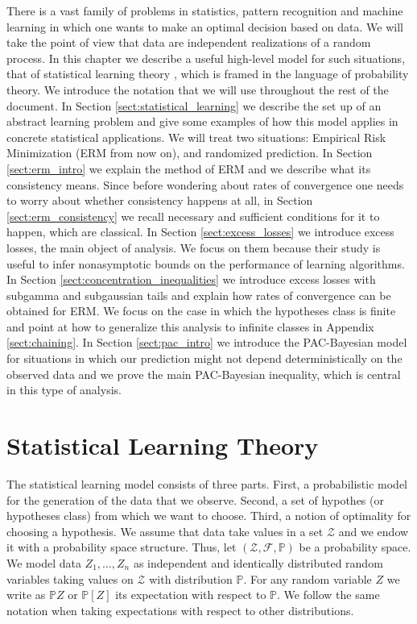 \documentclass{uvamath}
\newcommand*{\calF}{\mathcal{F}}
\newcommand*{\calZ}{\mathcal{Z}}
\newcommand*{\bbP}{\mathbb{P}}
\theoremstyle{remark}
\theoremstyle{definition}
\theoremstyle{definition}
\theoremstyle{definition}
\theoremstyle{definition}
\theoremstyle{definition}
\begin{document}
There is a vast family of problems in statistics, pattern recognition
and machine learning in which one wants to make an optimal decision
based on data. We will take the point of view that data are
independent realizations of a random process. In this chapter we
describe a useful high-level model for such situations, that of
statistical learning theory \citep{vapnik_statistical_1998}, which is
framed in the language of probability theory. We introduce the
notation that we will use throughout the rest of the document. In
Section \ref{sect:statistical_learning} we describe the set up of an
abstract learning problem and give some examples of how this model
applies in concrete statistical applications. We will treat two
situations: Empirical Risk Minimization (ERM from now on), and
randomized prediction. In Section \ref{sect:erm_intro} we explain the
method of ERM and we describe what its consistency means. Since before
wondering about rates of convergence one needs to worry about whether
consistency happens at all, in Section \ref{sect:erm_consistency} we
recall necessary and sufficient conditions for it to happen, which are
classical. In Section \ref{sect:excess_losses} we introduce excess
losses, the main object of analysis. We focus on them because their
study is useful to infer nonasymptotic bounds on the performance of
learning algorithms. In Section \ref{sect:concentration_inequalities}
we introduce excess losses with subgamma and subgaussian tails and
explain how rates of convergence can be obtained for ERM. We focus on
the case in which the hypotheses class is finite and point at how to
generalize this analysis to infinite classes in Appendix
\ref{sect:chaining}. In Section \ref{sect:pac_intro} we introduce the
PAC-Bayesian model for situations in which our prediction might not
depend deterministically on the observed data and we prove the main
PAC-Bayesian inequality, which is central in this type of analysis.

\section{Statistical Learning
  Theory \label{sect:statistical_learning}}

The statistical learning model consists of three parts. First, a
probabilistic model for the generation of the data that we observe.
Second, a set of hypothes (or hypotheses class) from which we want to
choose. Third, a notion of optimality for choosing a hypothesis. We
assume that data take values in a set $\calZ$ and we endow it with a
probability space structure. Thus, let $(\calZ, \calF,\bbP)$ be a
probability space. We model data $Z_1, \dots, Z_n$ as independent and
identically distributed random variables taking values on $\calZ$ with
distribution $\bbP$. For any random variable $Z$ we write as $\bbP Z$
or $\bbP[Z]$ its expectation with respect to $\bbP$. We follow the
same notation when taking expectations with respect to other
distributions.
\end{document}
